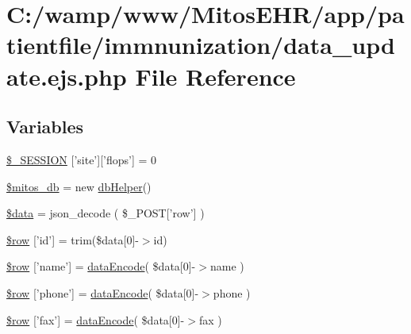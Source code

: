 \hypertarget{patientfile_2immnunization_2data__update_8ejs_8php}{\section{\-C\-:/wamp/www/\-Mitos\-E\-H\-R/app/patientfile/immnunization/data\-\_\-update.ejs.\-php \-File \-Reference}
\label{patientfile_2immnunization_2data__update_8ejs_8php}
}
\subsection*{\-Variables}
\begin{DoxyCompactItemize}
\item 
\hyperlink{patientfile_2immnunization_2data__update_8ejs_8php_a99fda8552a3e58235643b79f5af3ded8}{\$\-\_\-\-S\-E\-S\-S\-I\-O\-N} \mbox{[}'site'\mbox{]}\mbox{[}'flops'\mbox{]} = 0
\item 
\hyperlink{patientfile_2immnunization_2data__update_8ejs_8php_ab5d961f93efe4e2e8d8374f01dd6c65a}{\$mitos\-\_\-db} = new \hyperlink{classdb_helper}{db\-Helper}()
\item 
\hyperlink{patientfile_2immnunization_2data__update_8ejs_8php_a6efc15b5a2314dd4b5aaa556a375c6d6}{\$data} = json\-\_\-decode ( \$\-\_\-\-P\-O\-S\-T\mbox{[}'row'\mbox{]} )
\item 
\hyperlink{patientfile_2immnunization_2data__update_8ejs_8php_a4d5e7bc8bd41ef1d4dbfdb851ced695a}{\$row} \mbox{[}'id'\mbox{]} = trim(\$data\mbox{[}0\mbox{]}-\/$>$id)
\item 
\hyperlink{patientfile_2immnunization_2data__update_8ejs_8php_a63a1136a683bf9c4637010f73791443a}{\$row} \mbox{[}'name'\mbox{]} = \hyperlink{data_exchange_8class_8php_a18220e6e744fcb46d788ed8b03b85f62}{data\-Encode}( \$data\mbox{[}0\mbox{]}-\/$>$name )
\item 
\hyperlink{patientfile_2immnunization_2data__update_8ejs_8php_a9eb773d64ffa16faf1e29ccbaf4f065c}{\$row} \mbox{[}'phone'\mbox{]} = \hyperlink{data_exchange_8class_8php_a18220e6e744fcb46d788ed8b03b85f62}{data\-Encode}( \$data\mbox{[}0\mbox{]}-\/$>$phone )
\item 
\hyperlink{patientfile_2immnunization_2data__update_8ejs_8php_addcf6434ea14720a2fb19d21dc55a8c9}{\$row} \mbox{[}'fax'\mbox{]} = \hyperlink{data_exchange_8class_8php_a18220e6e744fcb46d788ed8b03b85f62}{data\-Encode}( \$data\mbox{[}0\mbox{]}-\/$>$fax )

\end{DoxyCompactItemize}
